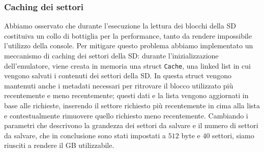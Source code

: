 \documentclass[hidelinks,12pt]{article}
\begin{document}
\subsubsection{Caching dei settori}
Abbiamo osservato che durante l'esecuzione la lettura dei blocchi della SD
costituiva un collo di bottiglia per la performance, tanto da rendere
impossibile l'utilizzo della console. Per mitigare questo problema abbiamo
implementato un meccanismo di caching dei settori della SD: durante
l'inizializzazione dell'emulatore, viene creata in memoria una struct
\texttt{Cache}, una linked list in cui vengono salvati i contenuti dei settori
della SD. In questa struct vengono mantenuti anche i metadati necessari per
ritrovare il blocco utilizzato più recentemente e meno recentemente; questi dati
e la lista vengono aggiornati in base alle richieste, inserendo il settore
richiesto più recentemente in cima alla lista e contestualmente rimuovere quello
richiesto meno recentemente. Cambiando i parametri che descrivono la grandezza
dei settori da salvare e il numero di settori da salvare, che in conclusione
sono stati impostati a $512$ byte e $40$ settori, siamo riusciti a rendere
il GB utilizzabile.

\end{document}
